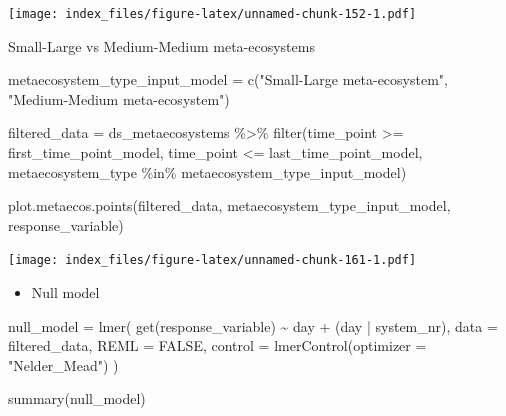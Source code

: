 \documentclass[
]{article}
\newenvironment{Shaded}{\begin{snugshade}}{\end{snugshade}}
\newcommand{\AttributeTok}[1]{\textcolor[rgb]{0.77,0.63,0.00}{#1}}
\newcommand{\ConstantTok}[1]{\textcolor[rgb]{0.00,0.00,0.00}{#1}}
\newcommand{\FunctionTok}[1]{\textcolor[rgb]{0.00,0.00,0.00}{#1}}
\newcommand{\NormalTok}[1]{#1}
\newcommand{\OtherTok}[1]{\textcolor[rgb]{0.56,0.35,0.01}{#1}}
\newcommand{\SpecialCharTok}[1]{\textcolor[rgb]{0.00,0.00,0.00}{#1}}
\newcommand{\StringTok}[1]{\textcolor[rgb]{0.31,0.60,0.02}{#1}}
\providecommand{\tightlist}{%
  \setlength{\itemsep}{0pt}\setlength{\parskip}{0pt}}
\begin{document}
\texttt{[image: index\_files/figure-latex/unnamed-chunk-152-1.pdf]}

Small-Large vs Medium-Medium meta-ecosystems

\begin{Shaded}
\begin{Highlighting}[]
\NormalTok{metaecosystem\_type\_input\_model }\OtherTok{=} \FunctionTok{c}\NormalTok{(}\StringTok{"Small{-}Large meta{-}ecosystem"}\NormalTok{,}
                                   \StringTok{"Medium{-}Medium meta{-}ecosystem"}\NormalTok{)}
\end{Highlighting}
\end{Shaded}

\begin{Shaded}
\begin{Highlighting}[]
\NormalTok{filtered\_data }\OtherTok{=}\NormalTok{ ds\_metaecosystems }\SpecialCharTok{\%\textgreater{}\%}
                         \FunctionTok{filter}\NormalTok{(time\_point }\SpecialCharTok{\textgreater{}=}\NormalTok{ first\_time\_point\_model,}
\NormalTok{                                time\_point }\SpecialCharTok{\textless{}=}\NormalTok{ last\_time\_point\_model,}
\NormalTok{                                metaecosystem\_type }\SpecialCharTok{\%in\%}\NormalTok{ metaecosystem\_type\_input\_model)}
\end{Highlighting}
\end{Shaded}

\begin{Shaded}
\begin{Highlighting}[]
\FunctionTok{plot.metaecos.points}\NormalTok{(filtered\_data,}
\NormalTok{                     metaecosystem\_type\_input\_model,}
\NormalTok{                     response\_variable)}
\end{Highlighting}
\end{Shaded}

\texttt{[image: index\_files/figure-latex/unnamed-chunk-161-1.pdf]}

\begin{itemize}
\tightlist
\item
  Null model
\end{itemize}

\begin{Shaded}
\begin{Highlighting}[]
\NormalTok{null\_model }\OtherTok{=} \FunctionTok{lmer}\NormalTok{(}
  \FunctionTok{get}\NormalTok{(response\_variable) }\SpecialCharTok{\textasciitilde{}}
\NormalTok{    day }\SpecialCharTok{+} 
\NormalTok{    (day }\SpecialCharTok{|}\NormalTok{ system\_nr), }
  \AttributeTok{data =}\NormalTok{ filtered\_data,}
  \AttributeTok{REML =} \ConstantTok{FALSE}\NormalTok{,}
  \AttributeTok{control =} \FunctionTok{lmerControl}\NormalTok{(}\AttributeTok{optimizer =} \StringTok{"Nelder\_Mead"}\NormalTok{)}
\NormalTok{)}

\FunctionTok{summary}\NormalTok{(null\_model)}
\end{Highlighting}
\end{Shaded}
\end{document}
